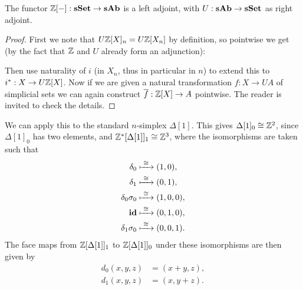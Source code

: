 \begin{lemma}
	The functor $\mathbb{Z}[-]: \mathbf{sSet} \to \mathbf{sAb}$ is a left adjoint, with $U: \mathbf{sAb} \to \mathbf{sSet}$ as right adjoint.
\end{lemma}
\begin{proof}
	First we note that $U\mathbb{Z}[X]_n = U\mathbb{Z}[X_n]$ by definition, so pointwise we get (by the fact that $\mathbb{Z}$ and $U$ already form an adjunction):
\begin{center}
\end{center}
	Then use naturality of $i$ (in $X_n$, thus in particular in $n$) to extend this to $i^\ast : X \to U\mathbb{Z}[X]$. Now if we are given a natural transformation $f: X \to UA$ of simplicial sets we can again construct $\overline{f}: \mathbb{Z}[X] \to A$ pointwise. The reader is invited to check the details.
\end{proof}

\begin{example}
	We can apply this to the standard $n$-simplex $\Delta[1]$. This gives $\Delta[1]_0 \cong \mathbb{Z}^2$, since $\Delta[1]_0$ has two elements, and $\mathbb{Z}^\ast[\Delta[1]]_1 \cong \mathbb{Z}^3$, where the isomorphisms are taken such that
	\begin{align*}
		\delta_0         &\xmapsto{\,\,{\cong}\,\,} (1, 0), \\
		\delta_1         &\xmapsto{\,\,{\cong}\,\,} (0, 1), \\
		\delta_0\sigma_0 &\xmapsto{\,\,{\cong}\,\,} (1, 0, 0), \\
		\mathbf{id}              &\xmapsto{\,\,{\cong}\,\,} (0, 1, 0), \\
		\delta_1\sigma_0 &\xmapsto{\,\,{\cong}\,\,} (0, 0, 1).
	\end{align*}
	The face maps from $\mathbb{Z}[\Delta[1]]_1$ to $\mathbb{Z}[\Delta[1]]_0$ under these isomorphisms are then given by
	\begin{align*}
		d_0(x, y, z) &= (x+y, z), \\
		d_1(x, y, z) &= (x, y+z).
	\end{align*}
\end{example}

